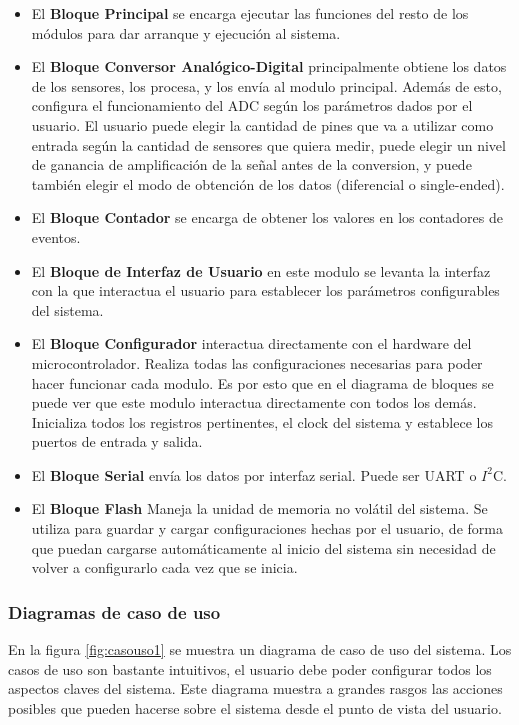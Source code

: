 \documentclass{article}
\theoremstyle{definition}
\theoremstyle{remark}
\begin{document}
\begin{itemize}
  \item El \textbf{Bloque Principal} se encarga ejecutar las funciones del resto de los módulos para dar arranque y ejecución al sistema.
  \item El \textbf{Bloque Conversor Analógico-Digital} principalmente obtiene los datos de los sensores, los procesa, y los envía al modulo principal. Además de esto, configura el funcionamiento del ADC según los parámetros dados por el usuario. El usuario puede elegir la cantidad de pines que va a utilizar como entrada según la cantidad de sensores que quiera medir, puede elegir un nivel de ganancia de amplificación de la señal antes de la conversion, y puede también elegir el modo de obtención de los datos (diferencial o single-ended).
  \item El \textbf{Bloque Contador} se encarga de obtener los valores en los contadores de eventos.
  \item El \textbf{Bloque de Interfaz de Usuario} en este modulo se levanta la interfaz con la que interactua el usuario para establecer los parámetros configurables del sistema.
  \item El \textbf{Bloque Configurador} interactua directamente con el hardware del microcontrolador. Realiza todas las configuraciones necesarias para poder hacer funcionar cada modulo. Es por esto que en el diagrama de bloques se puede ver que este modulo interactua directamente con todos los demás. Inicializa todos los registros pertinentes, el clock del sistema y establece los puertos de entrada y salida.
  \item El \textbf{Bloque Serial} envía los datos por interfaz serial. Puede ser UART o $I^{2}$C.
  \item El \textbf{Bloque Flash} Maneja la unidad de memoria no volátil del sistema. Se utiliza para guardar y cargar configuraciones hechas por el usuario, de forma que puedan cargarse automáticamente al inicio del sistema sin necesidad de volver a configurarlo cada vez que se inicia.
\end{itemize}


\subsubsection{Diagramas de caso de uso} %
\label{ssub:diagramas_de_caso_de_uso}

En la figura \ref{fig:casouso1} se muestra un diagrama de caso de uso del sistema. Los casos de uso son bastante intuitivos, el usuario debe poder configurar todos los aspectos claves del sistema. Este diagrama muestra a grandes rasgos las acciones posibles que pueden hacerse sobre el sistema desde el punto de vista del usuario.
\end{document}
